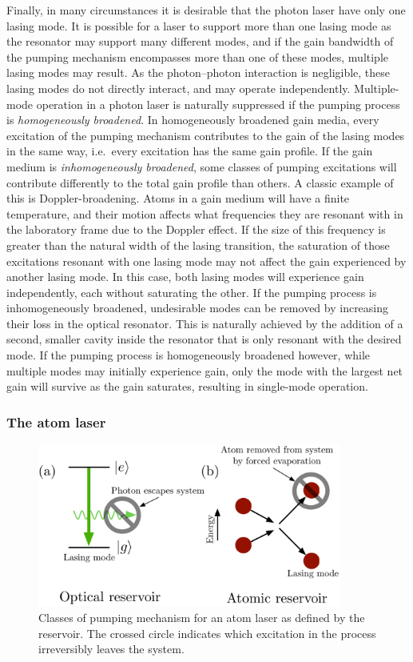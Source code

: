 Finally, in many circumstances it is desirable that the photon laser have only one lasing mode.  It is possible for a laser to support more than one lasing mode as the resonator may support many different modes, and if the gain bandwidth of the pumping mechanism encompasses more than one of these modes, multiple lasing modes may result.  As the photon--photon interaction is negligible, these lasing modes do not directly interact, and may operate independently.  Multiple-mode operation in a photon laser is naturally suppressed if the pumping process is \emph{homogeneously broadened}.  In homogeneously broadened gain media, every excitation of the pumping mechanism contributes to the gain of the lasing modes in the same way, i.e.\ every excitation has the same gain profile.  If the gain medium is \emph{inhomogeneously broadened}, some classes of pumping excitations will contribute differently to the total gain profile than others.  A classic example of this is Doppler-broadening.  Atoms in a gain medium will have a finite temperature, and their motion affects what frequencies they are resonant with in the laboratory frame due to the Doppler effect.  If the size of this frequency is greater than the natural width of the lasing transition, the saturation of those excitations resonant with one lasing mode may not affect the gain experienced by another lasing mode.  In this case, both lasing modes will experience gain independently, each without saturating the other.  If the pumping process is inhomogeneously broadened, undesirable modes can be removed by increasing their loss in the optical resonator.  This is naturally achieved by the addition of a second, smaller cavity inside the resonator that is only resonant with the desired mode.  If the pumping process is homogeneously broadened however, while multiple modes may initially experience gain, only the mode with the largest net gain will survive as the gain saturates, resulting in single-mode operation.


\subsubsection{The atom laser}

\begin{figure}
    \centering
    \includegraphics[width=10cm]{ReservoirChoices}
    \caption{
        \label{Introduction:ReservoirChoices}
        Classes of pumping mechanism for an atom laser as defined by the reservoir.  The crossed circle indicates which excitation in the process irreversibly leaves the system.
    }
\end{figure}

